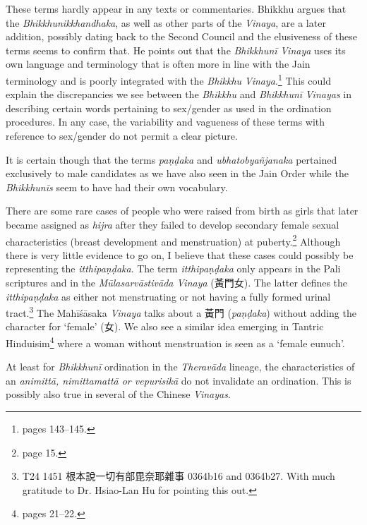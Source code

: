 These terms hardly appear in any texts or commentaries. Bhikkhu \cite{sujato2009} argues that the \textit{Bhikkhunikkhandhaka}, as well as other parts of the \textit{Vinaya}, are a later addition, possibly dating back to the Second Council and the elusiveness of these terms seems to confirm that. He points out that the \textit{Bhikkhunī} \textit{Vinaya} uses its own language and terminology that is often more in line with the Jain terminology and is poorly integrated with the \textit{Bhikkhu} \textit{Vinaya}.\footnote{\cite{sujato2009} pages 143–145.} This could explain the discrepancies we see between the \textit{Bhikkhu} and \textit{Bhikkhunī} \textit{Vinayas} in describing certain words pertaining to sex/gender as used in the ordination procedures. In any case, the variability and vagueness of these terms with reference to sex/gender do not permit a clear picture. 

It is certain though that the terms \textit{paṇḍaka} and \textit{ubhatob­yañ­janaka} pertained exclusively to male candidates as we have also seen in the Jain Order while the \textit{Bhikkhunīs} seem to have had their own vocabulary.

There are some rare cases of people who were raised from birth as girls that later became assigned as \textit{hijra} after they failed to develop secondary female sexual characteristics (breast development and menstruation) at puberty.\footnote{\cite{nanda} page 15.} Although there is very little evidence to go on, I believe that these cases could possibly be representing the \textit{itthipaṇḍaka}. The term \textit{itthipaṇḍaka} only appears in the Pali scriptures and in the \textit{Mūlasarvāstivāda Vinaya} (黃門女). The latter defines the \textit{itthipaṇḍaka} as either not menstruating or not having a fully formed urinal tract.\footnote{T24 1451 根本說一切有部毘奈耶雜事 0364b16 and 0364b27. With much gratitude to Dr. Hsiao-Lan Hu for pointing this out.} The Mahīśāsaka \textit{Vinaya} talks about a 黃門 (\textit{paṇḍaka}) without adding the character for `female' (女). We also see a similar idea emerging in Tantric Hinduisim\footnote{\cite{nanda} pages 21–22.} where a woman without menstruation is seen as a `female eunuch'.

At least for \textit{Bhikkhunī} ordination in the \textit{Theravāda} lineage, the characteristics of an \textit{animittā, nimittamattā or vepurisikā} do not invalidate an ordination. This is possibly also true in several of the Chinese \textit{Vinayas}.
